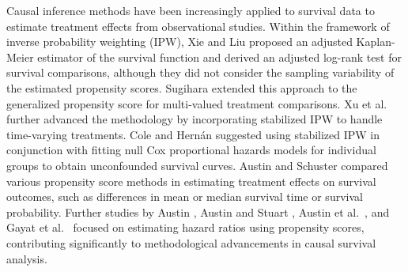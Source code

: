 \documentclass[useAMS,referee]{biom}
\begin{document}
Causal inference methods have been increasingly applied to survival data to estimate treatment effects from observational studies. Within the framework of inverse probability weighting (IPW), Xie and Liu \parencite{xie2005adjusted} proposed an adjusted Kaplan-Meier estimator of the survival function and derived an adjusted log-rank test for survival comparisons, although they did not consider the sampling variability of the estimated propensity scores. Sugihara \parencite{sugihara2010survival} extended this approach to the generalized propensity score for multi-valued treatment comparisons. Xu et al.\ \parencite{xu2010estimating} further advanced the methodology by incorporating stabilized IPW to handle time-varying treatments. Cole and Hernán \parencite{cole2004adjusted} suggested using stabilized IPW in conjunction with fitting null Cox proportional hazards models for individual groups to obtain unconfounded survival curves. 
Austin and Schuster \parencite{austin2016performance} compared various propensity score methods in estimating treatment effects on survival outcomes, such as differences in mean or median survival time or survival probability. Further studies by Austin \parencite{austin2013estimating}, Austin and Stuart \parencite{austin2015moving, }, Austin et al.\ \parencite{austin2017estimating}, and Gayat et al.\ \parencite{gayat2012propensity} focused on estimating hazard ratios using propensity scores, contributing significantly to methodological advancements in causal survival analysis. 
\end{document}
